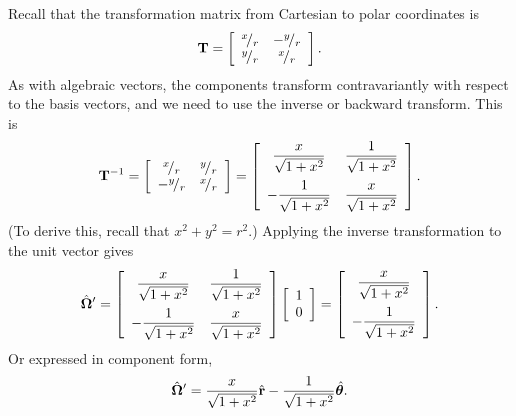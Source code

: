 Recall that the transformation matrix from Cartesian to polar coordinates is
\begin{align}
  \mathbf{T} = 
   \left[ \begin{array}{c c}
   {}^{x}\!/_{r} & -{}^{y}\!/_{r} \\
   {}^{y}\!/_{r} &  {}^{x}\!/_{r} \\ \end{array} \right] . \nonumber
\end{align}
As with algebraic vectors, the components transform contravariantly with respect to the basis vectors, and we need to use the inverse or backward transform. This is
\begin{align}
  \mathbf{T}^{-1} = 
   \left[ \begin{array}{c c}
    \rfrac{x}{r} &  \rfrac{y}{r} \\
   -\rfrac{y}{r} &  \rfrac{x}{r} \\ \end{array} \right] 
   = \left[ \begin{array}{c c}
    \dfrac{x}{\sqrt{ 1 + x^2 }} &  \dfrac{1}{\sqrt{ 1 + x^2 }} \vspace{0.2cm} \\
   -\dfrac{1}{\sqrt{ 1 + x^2 }} &  \dfrac{x}{\sqrt{ 1 + x^2 }} \\ \end{array} \right] . 
\end{align}
(To derive this, recall that $x^2 + y^2 = r^2$.) Applying the inverse transformation to the unit vector gives
\begin{align}
  \dir' = 
  \left[ \begin{array}{c c}
    \dfrac{x}{\sqrt{ 1 + x^2 }} &  \dfrac{1}{\sqrt{ 1 + x^2 }} \vspace{0.2cm} \\
   -\dfrac{1}{\sqrt{ 1 + x^2 }} &  \dfrac{x}{\sqrt{ 1 + x^2 }} \\ \end{array} \right]
   \left[ \begin{array}{c} 1 \\ 0 \\ \end{array} \right] =
   \left[ \begin{array}{c} \dfrac{x}{\sqrt{ 1 + x^2 }}  \vspace{0.2cm} \\ -\dfrac{1}{\sqrt{ 1 + x^2 }} \\ \end{array} \right] .
\end{align}
Or expressed in component form,
\begin{align}
  \hat{\mathbf{\Omega}}' = \frac{x}{\sqrt{ 1 + x^2 }} \hat{\mathbf{r}} - \frac{1}{\sqrt{ 1 + x^2 }} \hat{\boldsymbol\theta} .
\end{align}


